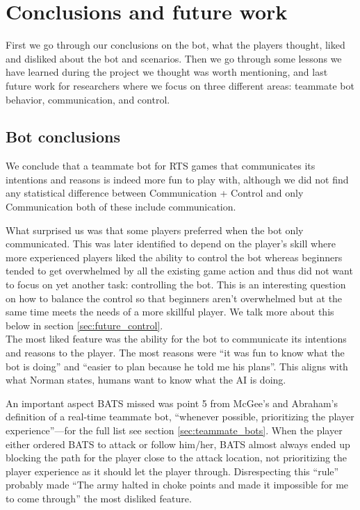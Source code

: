 \chapter{Conclusions and future work}
First we go through our conclusions on the bot, what the players thought, liked and disliked about
the bot and scenarios. Then we go through some lessons we have learned during the project we thought
was worth mentioning, and last future work for researchers where we focus on three different areas:
teammate bot behavior, communication, and control.

\section{Bot conclusions}
We conclude that a teammate bot for RTS games that communicates its intentions and reasons is indeed
more fun to play with, although we did not find any statistical difference between Communication +
Control and only Communication both of these include communication.

What surprised us was that some players
preferred when the bot only communicated. This was later identified to depend on the player's skill
where more experienced players liked the ability to control the bot whereas beginners tended to get
overwhelmed by all the existing game action and thus did not want to focus on yet another task:
controlling the bot. This is an interesting question on how to balance the control so that
beginners aren't overwhelmed but at the same time meets the needs of a more skillful player. We talk
more about this below in section \ref{sec:future_control}.\\


The most liked feature was the ability for the bot to communicate its intentions and reasons to the
player. The most reasons were ``it was fun to know what the bot is doing'' and ``easier to plan
because he told me his plans''. This aligns with what Norman states, humans want to know what the AI
is doing\cite{norman07}.

An important aspect BATS missed was point 5 from McGee's and Abraham's definition\cite{mcgee10} of a
real-time teammate bot, ``whenever possible, prioritizing the player experience''—for the full list
see section \ref{sec:teammate_bots}. When the player either ordered BATS to attack or follow
him/her, BATS almost always ended up blocking the path for the player close to the attack location,
not prioritizing the player experience as it should let the player through.
Disrespecting this ``rule'' probably made ``The army halted in choke points and made it impossible
for me to come through'' the most disliked feature.


